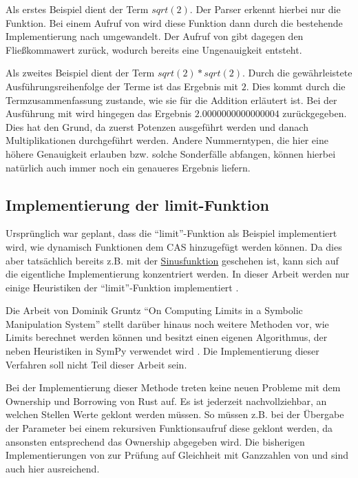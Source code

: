 \documentclass[11pt,a4paper, ngerman]{article}
\begin{document}
Als erstes Beispiel dient der Term $sqrt(2)$. Der Parser erkennt hierbei nur die Funktion. Bei einem Aufruf von  wird diese Funktion dann durch die bestehende Implementierung nach  umgewandelt. Der Aufruf von  gibt dagegen den Fließkommawert  zurück, wodurch bereits eine Ungenauigkeit entsteht.

Als zweites Beispiel dient der Term $sqrt(2)*sqrt(2)$. Durch die gewährleistete Ausführungsreihenfolge der Terme ist das Ergebnis mit  $2$. Dies kommt durch die Termzusammenfassung zustande, wie sie für die Addition erläutert ist. Bei der Ausführung mit  wird hingegen das Ergebnis $2.0000000000000004$ zurückgegeben. Dies hat den Grund, da zuerst Potenzen ausgeführt werden und danach Multiplikationen durchgeführt werden. Andere Nummerntypen, die hier eine höhere Genauigkeit erlauben bzw. solche Sonderfälle abfangen, können hierbei natürlich auch immer noch ein genaueres Ergebnis liefern.

\subsection{Implementierung der limit-Funktion}
Ursprünglich war geplant, dass die ``limit''-Funktion als Beispiel implementiert wird, wie dynamisch Funktionen dem CAS hinzugefügt werden können. Da dies aber tatsächlich bereits z.B. mit der \hyperref[sec:EvalFnFuncs]{Sinusfunktion} geschehen ist, kann sich auf die eigentliche Implementierung konzentriert werden. In dieser Arbeit werden nur einige Heuristiken der ``limit''-Funktion implementiert \cite{ListLimitHeuristic}.

Die Arbeit von Dominik Gruntz ``On Computing Limits in a Symbolic Manipulation System'' \cite{GruntzPdf} stellt darüber hinaus noch weitere Methoden vor, wie Limits berechnet werden können und besitzt einen eigenen Algorithmus, der neben Heuristiken in SymPy verwendet wird \cite{SympyLimitNote}. Die Implementierung dieser Verfahren soll nicht Teil dieser Arbeit sein.

Bei der Implementierung dieser Methode treten keine neuen Probleme mit dem Ownership und Borrowing von Rust auf. Es ist jederzeit nachvollziehbar, an welchen Stellen Werte geklont werden müssen. So müssen z.B. bei der Übergabe der Parameter bei einem rekursiven Funktionsaufruf diese geklont werden, da ansonsten entsprechend das Ownership abgegeben wird. Die bisherigen Implementierungen von  zur Prüfung auf Gleichheit mit Ganzzahlen von  und  sind auch hier ausreichend.
\end{document}

